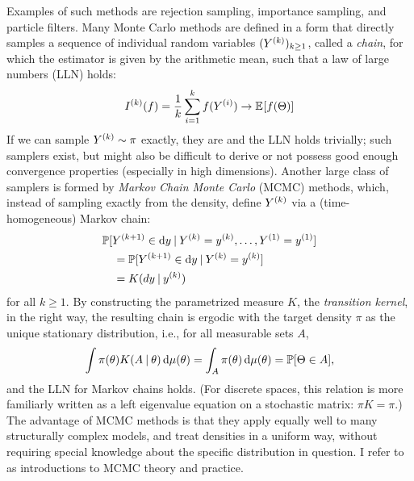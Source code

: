Examples of such methods are rejection sampling, importance sampling, and particle filters.  Many
Monte Carlo methods are defined in a form that directly samples a sequence of individual random
variables \((Y^{(k)})_{k \ge 1}\), called a \emph{chain}, for which the estimator is given by the
arithmetic mean, such that a law of large numbers (LLN) holds:
\begin{equation}
  \label{eq:mc-lln}
  \kth{I}(f) = \frac{1}{k} \sum_{i=1}^{k} f(\kth[i]{Y}) \to \Exp{f(\Theta)}
\end{equation}
If we can sample \(Y^{(k)} \sim \pi\) exactly, they are \iid{} and the LLN holds trivially; such
samplers exist, but might also be difficult to derive or not possess good enough convergence
properties (especially in high dimensions).  Another large class of samplers is formed by
\emph{Markov Chain Monte Carlo} (MCMC) methods, which, instead of sampling exactly from the density,
define \(Y^{(k)}\) via a (time-homogeneous) Markov chain:
\begin{equation}
  \label{eq:mc-kernel}
  \begin{aligned}
    &\Prob{\kth[k+1]{Y} \in \dif y
      \given \kth{Y} = \kth{y}, \ldots, \kth[1]{Y} = \kth[1]{y}} \\
    &\quad = \Prob{\kth[k+1]{Y} \in \dif y \given \kth{Y} = \kth{y}}  \\
    &\quad = K(dy \given \kth{y}) \\
  \end{aligned}
\end{equation}
for all \(k \ge 1\).  By constructing the parametrized measure \(K\), the \emph{transition kernel},
in the right way, the resulting chain is ergodic with the target density \(\pi\) as the unique
stationary distribution, i.e., for all measurable sets \(A\),
\begin{equation}
  \label{eq:stationarity}
  \int \pi(\theta) K(A \given \theta) \dif\mu(\theta) = \int_A \pi(\theta) \dif\mu(\theta) =
  \Prob{\Theta \in A},
\end{equation}
and the LLN for Markov chains holds.  (For discrete spaces, this relation is more familiarly written
as a left eigenvalue equation on a stochastic matrix: \(\pi K = \pi\).)  The advantage of MCMC
methods is that they apply equally well to many structurally complex models, and treat densities in
a uniform way, without requiring special knowledge about the specific distribution in question.  I
refer to \textcites[chapter 6]{vihola2020lectures}{robert1999monte}[chapters 24 and
following]{murphy2012machine} as introductions to MCMC theory and practice.


